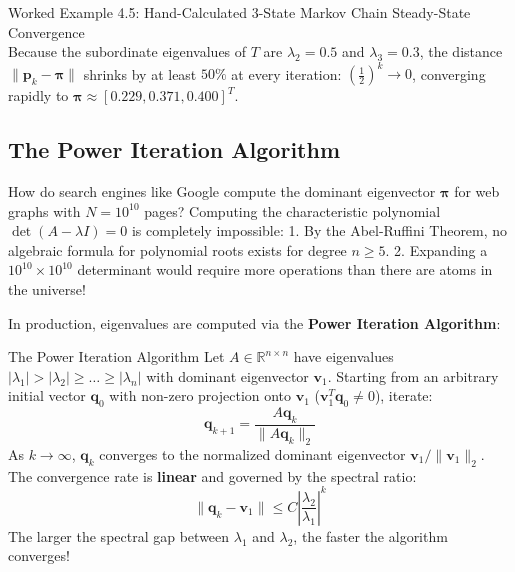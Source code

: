 \begin{examplebox}{Worked Example 4.5: Hand-Calculated 3-State Markov Chain Steady-State Convergence}
\begin{equation*}
\end{equation*}
Because the subordinate eigenvalues of $T$ are $\lambda_2 = 0.5$ and $\lambda_3 = 0.3$, the distance $\|\mathbf{p}_k - \boldsymbol{\pi}\|$ shrinks by at least $50\%$ at every iteration: $(\frac{1}{2})^k \to 0$, converging rapidly to $\boldsymbol{\pi} \approx [0.229, 0.371, 0.400]^T$.
\end{examplebox}

\subsection{The Power Iteration Algorithm}
\label{subsec:power_iteration}
How do search engines like Google compute the dominant eigenvector $\boldsymbol{\pi}$ for web graphs with $N = 10^{10}$ pages?
Computing the characteristic polynomial $\det(A - \lambda I) = 0$ is completely impossible:
1. By the Abel-Ruffini Theorem, no algebraic formula for polynomial roots exists for degree $n \ge 5$.
2. Expanding a $10^{10} \times 10^{10}$ determinant would require more operations than there are atoms in the universe!

In production, eigenvalues are computed via the \textbf{Power Iteration Algorithm}:

\begin{theorembox}{The Power Iteration Algorithm}
Let $A \in \mathbb{R}^{n \times n}$ have eigenvalues $|\lambda_1| > |\lambda_2| \ge \dots \ge |\lambda_n|$ with dominant eigenvector $\mathbf{v}_1$.
Starting from an arbitrary initial vector $\mathbf{q}_0$ with non-zero projection onto $\mathbf{v}_1$ ($\mathbf{v}_1^T \mathbf{q}_0 \ne 0$), iterate:
\begin{equation}
\mathbf{q}_{k+1} = \frac{A \mathbf{q}_k}{\|A \mathbf{q}_k\|_2}
\label{eq:power_iteration}
\end{equation}
As $k \to \infty$, $\mathbf{q}_k$ converges to the normalized dominant eigenvector $\mathbf{v}_1 / \|\mathbf{v}_1\|_2$.
The convergence rate is \textbf{linear} and governed by the spectral ratio:
\begin{equation}
\|\mathbf{q}_k - \mathbf{v}_1\| \le C \left| \frac{\lambda_2}{\lambda_1} \right|^k
\end{equation}
The larger the spectral gap between $\lambda_1$ and $\lambda_2$, the faster the algorithm converges!
\end{theorembox}

